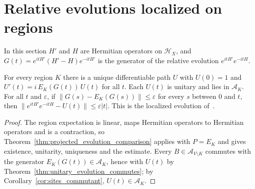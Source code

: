 \section{Relative evolutions localized on regions}
\label{sec:dynamics_relative}

In this section $H'$ and $H$ are Hermitian operators on $\mathcal H_X$, and
$G(t)=e^{itH'}(H'-H)e^{-itH'}$ is the generator of the relative evolution
$e^{itH'}e^{-itH}$.

\begin{theorem}
    \label{thm:dynamics_projected_relative}
    \leanok
    For every region $K$ there is a unique differentiable path $U$ with $U(0)=1$
    and $U'(t)=i\,E_K(G(t))\,U(t)$ for all $t$. Each $U(t)$ is unitary and lies in
    $\mathcal A_K$. For all $t$ and $\varepsilon$, if
    $\lVert G(s)-E_K(G(s))\rVert\leq\varepsilon$ for every $s$ between $0$ and $t$,
    then $\lVert e^{itH'}e^{-itH}-U(t)\rVert\leq\varepsilon|t|$. This is the
    localized evolution of~\cite[Section~2]{OpenAI2026PolynomialPEPS}.
\end{theorem}
\begin{proof}\leanok
    The region expectation is linear, maps Hermitian operators to Hermitian
    operators and is a contraction, so
    Theorem~\ref{thm:projected_evolution_comparison} applies with $P=E_K$ and
    gives existence, unitarity, uniqueness and the estimate. Every
    $B\in\mathcal A_{V\setminus K}$ commutes with the generator
    $E_K(G(t))\in\mathcal A_K$, hence with $U(t)$ by
    Theorem~\ref{thm:unitary_evolution_commutes}; by
    Corollary~\ref{cor:sites_commutant}, $U(t)\in\mathcal A_K$.
\end{proof}

